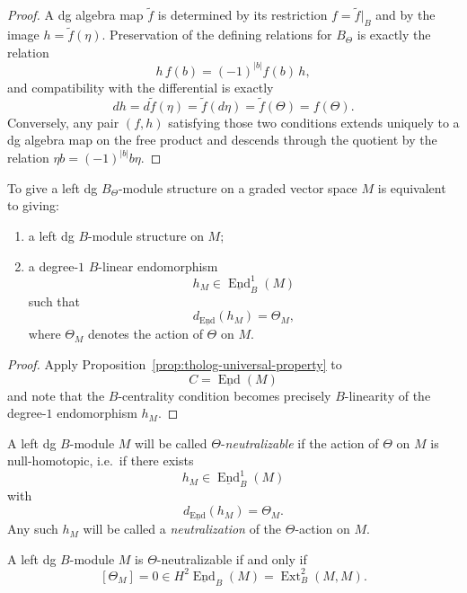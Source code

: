 \begin{proof}
A dg algebra map \(\widetilde f\) is determined by its restriction \(f=\widetilde f|_{B}\) and by the image
\(h=\widetilde f(\eta)\).
Preservation of the defining relations for \(B_{\Theta}\) is exactly the relation
\[
h\,f(b)=(-1)^{|b|}f(b)\,h,
\]
and compatibility with the differential is exactly
\[
dh=d\widetilde f(\eta)=\widetilde f(d\eta)=\widetilde f(\Theta)=f(\Theta).
\]
Conversely, any pair \((f,h)\) satisfying those two conditions extends uniquely to a dg algebra map on the free product and descends through the quotient by the relation \(\eta b=(-1)^{|b|}b\eta\).
\end{proof}

\begin{corollary}
\label{cor:tholog-modules-neutralizations}
To give a left dg \(B_{\Theta}\)-module structure on a graded vector space \(M\) is equivalent to giving:
\begin{enumerate}
\item a left dg \(B\)-module structure on \(M\);
\item a degree-\(1\) \(B\)-linear endomorphism
\[
h_{M}\in \underline{\operatorname{End}}^{1}_{B}(M)
\]
such that
\[
d_{\underline{\operatorname{End}}}(h_{M})=\Theta_{M},
\]
where \(\Theta_{M}\) denotes the action of \(\Theta\) on \(M\).
\end{enumerate}
\end{corollary}

\begin{proof}
Apply Proposition~\ref{prop:tholog-universal-property} to
\[
C=\underline{\operatorname{End}}(M)
\]
and note that the \(B\)-centrality condition becomes precisely \(B\)-linearity of the degree-\(1\) endomorphism \(h_{M}\).
\end{proof}

\begin{definition}
\label{def:tholog-neutralizable}
A left dg \(B\)-module \(M\) will be called \(\Theta\)-\emph{neutralizable} if the action of \(\Theta\) on \(M\) is null-homotopic, i.e.\ if there exists
\[
h_{M}\in \underline{\operatorname{End}}^{1}_{B}(M)
\]
with
\[
d_{\underline{\operatorname{End}}}(h_{M})=\Theta_{M}.
\]
Any such \(h_{M}\) will be called a \emph{neutralization} of the \(\Theta\)-action on \(M\).
\end{definition}

\begin{corollary}
\label{cor:tholog-obstruction-class}
A left dg \(B\)-module \(M\) is \(\Theta\)-neutralizable if and only if
\[
[\Theta_{M}]=0\in H^{2}\underline{\operatorname{End}}_{B}(M)
=\operatorname{Ext}^{2}_{B}(M,M).
\]
\end{corollary}

